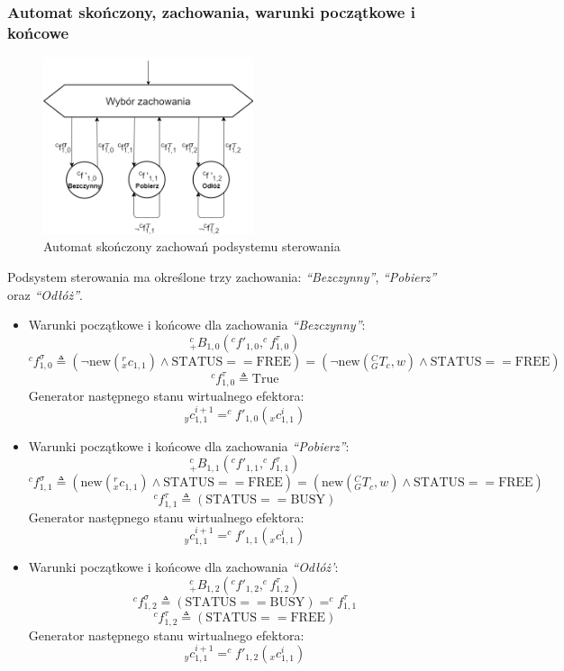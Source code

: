 \documentclass{article}
\begin{document}
\subsubsection{Automat skończony, zachowania, warunki początkowe i końcowe}
\begin{figure}[H]
	\centering
	\includegraphics[width=0.55\textwidth]{PS_automat.png}
	\caption{Automat skończony zachowań podsystemu sterowania}
	\label{fig::PS_automat}
\end{figure}

Podsystem sterowania ma okre\'slone trzy zachowania: \textit{``Bezczynny''}, \textit{``Pobierz''} oraz \textit{``Odłóż''}. 
\newline
\begin{itemize}
\item Warunki początkowe i końcowe dla zachowania \textit{``Bezczynny''}:
\[^c_+B_{1,0}( ^{c}f'_{1,0}, ^cf^\tau_{1,0} )\]
\[^cf^\sigma_{1,0} \triangleq (\neg \mbox{new}(^r_xc_{1,1}) \wedge \mbox{STATUS} == \mbox{FREE}) = (\neg \mbox{new}(^C_GT_c,w) \wedge \mbox{STATUS} == \mbox{FREE}) \]
\[^cf^\tau_{1,0} \triangleq \mbox {True}\] 
Generator następnego stanu wirtualnego efektora:
\[ _yc^{i+1}_{1,1} = ^{c}f'_{1,0}(_xc^i_{1,1})\]

\item Warunki początkowe i końcowe dla zachowania \textit{``Pobierz''}:
\[^c_+B_{1,1}( ^{c}f'_{1,1}, ^cf^\tau_{1,1} )\]
\[^cf^\sigma_{1,1} \triangleq (\mbox{new}(^r_xc_{1,1}) \wedge \mbox{STATUS} == \mbox{FREE}) = (\mbox{new}(^C_GT_c,w) \wedge \mbox{STATUS} == \mbox{FREE}) \]
\[^cf^\tau_{1,1} \triangleq (\mbox{STATUS} == \mbox{BUSY})\]
Generator następnego stanu wirtualnego efektora:
\[ _yc^{i+1}_{1,1} = ^{c}f'_{1,1}(_xc^i_{1,1})\]

\item Warunki początkowe i końcowe dla zachowania \textit{``Odłóż'}:
\[^c_+B_{1,2}( ^{c}f'_{1,2}, ^ef^\tau_{1,2} )\]
\[^cf^\sigma_{1,2} \triangleq  (\mbox{STATUS} == \mbox{BUSY}) = ^cf^\tau_{1,1}\]
\[^cf^\tau_{1,2} \triangleq (\mbox{STATUS} == \mbox{FREE})\]
Generator następnego stanu wirtualnego efektora:
\[ _yc^{i+1}_{1,1} = ^{c}f'_{1,2}(_xc^i_{1,1})\]
\end{itemize}
\end{document}
